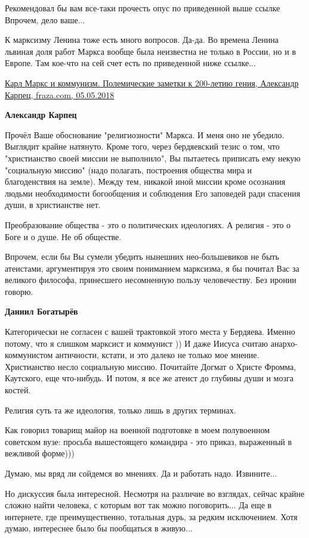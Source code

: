 \begin{itemize}
\begin{itemize}
Рекомендовал бы вам все-таки прочесть опус по приведенной выше ссылке Впрочем,
дело ваше...

К марксизму Ленина тоже есть много вопросов. Да-да. Во времена Ленина львиная
доля работ Маркса вообще была неизвестна не только в России, но и в Европе. Там
кое-что на сей счет есть по приведенной ниже ссылке...

\href{https://fraza.com/analytics/268667-karl-marks-i-kommunizm-polemicheskie-zametki-k-200-letiju-genija-}{%
Карл Маркс и коммунизм. Полемические заметки к 200-летию гения, Александр Карпец, fraza.com, 05.05.2018%
}

\textbf{Александр Карпец} 

Прочёл Ваше обоснование "религиозности" Маркса. И меня оно не убедило. Выглядит
крайне натянуто. Кроме того, через бердяевский тезис о том, что "христианство
своей миссии не выполнило", Вы пытаетесь приписать ему некую "социальную
миссию" (надо полагать, построения общества мира и благоденствия на земле).
Между тем, никакой иной миссии кроме осознания людьми необходимости богообщения
и соблюдения Его заповедей ради спасения души, в христианстве нет.

Преобразование общества - это о политических идеологиях. А религия - это о Боге
и о душе. Не об обществе.

Впрочем, если бы Вы сумели убедить нынешних нео-большевиков не быть атеистами,
аргументируя это своим пониманием марксизма, я бы почитал Вас за великого
философа, принесшего несомненную пользу человечеству. Без иронии говорю.

\textbf{Даниил Богатырёв} 

Категорически не согласен с вашей трактовкой этого места у Бердяева. Именно
потому, что я слишком марксист и коммунист )) И даже Иисуса считаю
анархо-коммунистом античности, кстати, и это далеко не только мое мнение.
Христианство несло социальную миссию. Почитайте Догмат о Христе Фромма,
Каутского, еще что-нибудь. И потом, я все же атеист до глубины души и мозга
костей.

Религия суть та же идеология, только лишь в других терминах.

Как говорил товарищ майор на военной подготовке в моем полувоенном советском
вузе: просьба вышестоящего командира - это приказ, выраженный в вежливой
форме)))

Думаю, мы вряд ли сойдемся во мнениях. Да и работать надо. Извините...

Но дискуссия была интересной. Несмотря на различие во взглядах, сейчас крайне
сложно найти человека, с которым вот так можно поговорить... Да еще в
интернете, где преимущественно, тотальная дурь, за редким исключением. Хотя
думаю, интереснее было бы пообщаться в живую...


\end{itemize}
\end{itemize}
